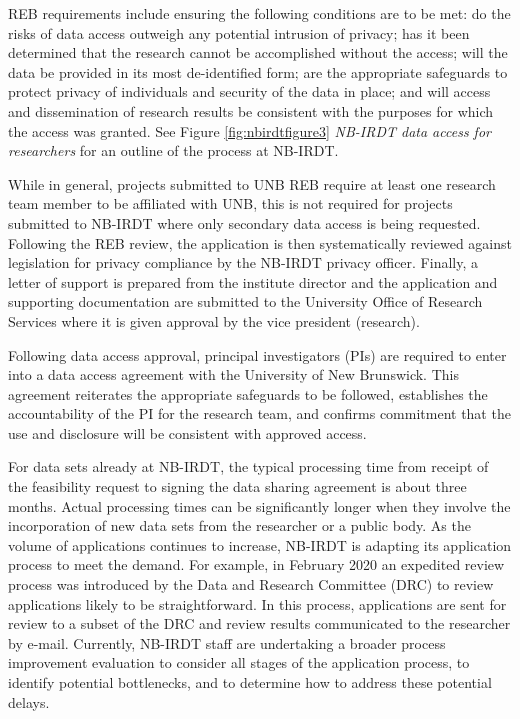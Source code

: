 REB requirements include ensuring the following conditions are to be met: do the risks of data access outweigh any potential intrusion of privacy; has it been determined that the research cannot be accomplished without the access; will the data be provided in its most de-identified form; are the appropriate safeguards to protect privacy of individuals and security of the data in place; and will access and dissemination of research results be consistent with the purposes for which the access was granted. See Figure \ref{fig:nbirdtfigure3} \emph{NB-IRDT data access for researchers} for an outline of the process at NB-IRDT.

While in general, projects submitted to UNB REB require at least one research team member to be affiliated with UNB, this is not required for projects submitted to NB-IRDT where only secondary data access is being requested. Following the REB review, the application is then systematically reviewed against legislation for privacy compliance by the NB-IRDT privacy officer. Finally, a letter of support is prepared from the institute director and the application and supporting documentation are submitted to the University Office of Research Services where it is given approval by the vice president (research).

Following data access approval, principal investigators (PIs) are required to enter into a data access agreement with the University of New Brunswick. This agreement reiterates the appropriate safeguards to be followed, establishes the accountability of the PI for the research team, and confirms commitment that the use and disclosure will be consistent with approved access.

For data sets already at NB-IRDT, the typical processing time from receipt of the feasibility request to signing the data sharing agreement is about three months. Actual processing times can be significantly longer when they involve the incorporation of new data sets from the researcher or a public body. As the volume of applications continues to increase, NB-IRDT is adapting its application process to meet the demand. For example, in February 2020 an expedited review process was introduced by the Data and Research Committee (DRC) to review applications likely to be straightforward. In this process, applications are sent for review to a subset of the DRC and review results communicated to the researcher by e-mail. Currently, NB-IRDT staff are undertaking a broader process improvement evaluation to consider all stages of the application process, to identify potential bottlenecks, and to determine how to address these potential delays.

